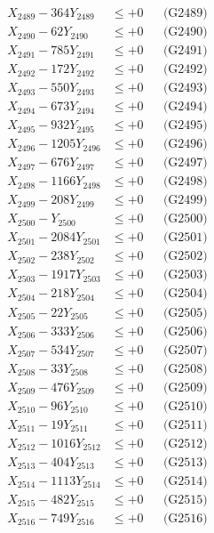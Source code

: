 \documentclass[a4paper,10pt]{article}
\begin{document}
{\begin{align}
X_{2489} - 364Y_{2489} &\leq +0 && \text{(G2489)} \\
X_{2490} - 62Y_{2490} &\leq +0 && \text{(G2490)} \\
\allowbreak
X_{2491} - 785Y_{2491} &\leq +0 && \text{(G2491)} \\
X_{2492} - 172Y_{2492} &\leq +0 && \text{(G2492)} \\
X_{2493} - 550Y_{2493} &\leq +0 && \text{(G2493)} \\
X_{2494} - 673Y_{2494} &\leq +0 && \text{(G2494)} \\
X_{2495} - 932Y_{2495} &\leq +0 && \text{(G2495)} \\
X_{2496} - 1205Y_{2496} &\leq +0 && \text{(G2496)} \\
X_{2497} - 676Y_{2497} &\leq +0 && \text{(G2497)} \\
X_{2498} - 1166Y_{2498} &\leq +0 && \text{(G2498)} \\
X_{2499} - 208Y_{2499} &\leq +0 && \text{(G2499)} \\
X_{2500} - Y_{2500} &\leq +0 && \text{(G2500)} \\
\allowbreak
X_{2501} - 2084Y_{2501} &\leq +0 && \text{(G2501)} \\
X_{2502} - 238Y_{2502} &\leq +0 && \text{(G2502)} \\
X_{2503} - 1917Y_{2503} &\leq +0 && \text{(G2503)} \\
X_{2504} - 218Y_{2504} &\leq +0 && \text{(G2504)} \\
X_{2505} - 22Y_{2505} &\leq +0 && \text{(G2505)} \\
X_{2506} - 333Y_{2506} &\leq +0 && \text{(G2506)} \\
X_{2507} - 534Y_{2507} &\leq +0 && \text{(G2507)} \\
X_{2508} - 33Y_{2508} &\leq +0 && \text{(G2508)} \\
X_{2509} - 476Y_{2509} &\leq +0 && \text{(G2509)} \\
X_{2510} - 96Y_{2510} &\leq +0 && \text{(G2510)} \\
\allowbreak
X_{2511} - 19Y_{2511} &\leq +0 && \text{(G2511)} \\
X_{2512} - 1016Y_{2512} &\leq +0 && \text{(G2512)} \\
X_{2513} - 404Y_{2513} &\leq +0 && \text{(G2513)} \\
X_{2514} - 1113Y_{2514} &\leq +0 && \text{(G2514)} \\
X_{2515} - 482Y_{2515} &\leq +0 && \text{(G2515)} \\
X_{2516} - 749Y_{2516} &\leq +0 && \text{(G2516)} \\

\end{align}}
\end{document}
